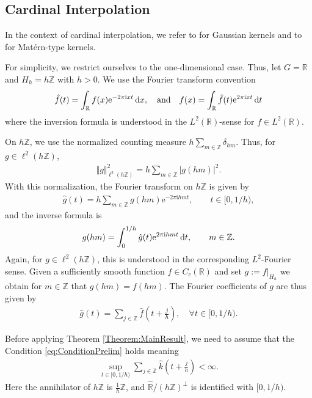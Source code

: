 \documentclass{article}
\renewcommand{\i}{\mathrm{i}}
\renewcommand{\d}{\, \textup{d}}
\newcommand{\R}{\mathbb{R}}
\newcommand{\Z}{\mathbb{Z}}
\newcommand{\e}{\mathrm{e}}
\begin{document}
\subsection{Cardinal Interpolation}

In the context of cardinal interpolation, we refer to \cite{hangelbroek2012cardinal} for Gaussian kernels and to \cite{bejancu2022uniformly} for Matérn-type kernels.

For simplicity, we restrict ourselves to the one-dimensional case. Thus, let $G=\R$ and $H_h=h \Z$ with $h>0$. We use the Fourier transform convention
\begin{align*}
    \hat{f}(t)= \int_{\R} f (x) \e^{-2\pi \i xt } \d x, \quad \textup{and} \quad f(x)=\int_{\R} \hat{f}(t) \e^{2\pi \i x t} \d t
\end{align*}
where the inversion formula is understood in the $L^2(\mathbb R)$-sense for $f\in L^2(\mathbb R)$.

On $h\mathbb Z$, we use the normalized counting measure $h\sum_{m\in\mathbb Z}\delta_{hm}$. Thus, for $g\in\ell^2(h\mathbb Z)$, 
\begin{align*}
    \Vert g\Vert_{\ell^2(h\mathbb Z)}^2
=
h\sum_{m\in\mathbb Z}|g(hm)|^2.
\end{align*}
With this normalization, the Fourier transform on $h\mathbb Z$ is given by
\begin{align*}
    \hat{g}(t)=h \sum_{m \in \Z} g(hm) \e^{-2\pi \i hmt},\qquad
t\in[0,1/h), 
\end{align*}
and the inverse formula is 
\begin{align*}
    g(hm)= \int_0^{1/h} \hat{g}(t) \e^{2\pi \i hm t } \d t, \qquad m \in \Z.
\end{align*}
Again, for $g\in\ell^2(h\mathbb Z)$, this is understood in the corresponding $L^2$-Fourier sense.
Given a sufficiently smooth function $f \in C_c(\R)$ and set $g:=f|_{H_h}$ we obtain for $m\in \Z$ that $g(hm)=f(hm)$. The Fourier coefficients of $g$ are thus given by 
\begin{align*}
    \hat{g}(t)=  \sum_{j \in \Z} \hat{f}\left( t+ \frac{j}{h} \right), \quad \forall t \in [0,1/h).
\end{align*}

Before applying Theorem \ref{Theorem:MainResult}, we need to assume that the Condition \eqref{eq:ConditionPrelim} holds meaning 
\begin{align}\label{eq:cardinalCondition}
    \sup_{t \in [0,1/h)} \sum_{j \in \Z} \hat{k}\left( t + \frac{j}{h} \right) < \infty.
\end{align}
Here the annihilator of $h\mathbb Z$ is $\frac1h\mathbb Z$, and $\hat{\mathbb R}/(h\mathbb Z)^\perp$ is identified with $[0,1/h)$.
\end{document}
